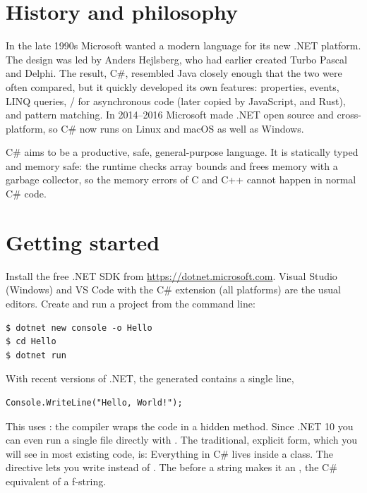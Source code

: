 \section{History and philosophy}

\begin{history}
In the late 1990s Microsoft wanted a modern language for its new .NET platform. The
design was led by Anders Hejlsberg, who had earlier created Turbo Pascal and Delphi. The
result, C\#, resembled Java closely enough that the two were often compared, but it
quickly developed its own features: properties, events, LINQ queries, /
for asynchronous code (later copied by JavaScript, \py and Rust), and pattern matching. In
2014--2016 Microsoft made .NET open source and cross-platform, so C\# now runs on Linux and
macOS as well as Windows.
\end{history}

C\# aims to be a productive, safe, general-purpose language. It is statically typed and
memory safe: the runtime checks array bounds and frees memory with a garbage collector, so
the memory errors of C and C++ cannot happen in normal C\# code.

\section{Getting started}

Install the free .NET SDK from \url{https://dotnet.microsoft.com}. Visual Studio (Windows)
and VS Code with the C\# extension (all platforms) are the usual editors. Create and run a
project from the command line:
\begin{lstlisting}[style=shell]
$ dotnet new console -o Hello
$ cd Hello
$ dotnet run
\end{lstlisting}
With recent versions of .NET, the generated  contains a single line,
\begin{lstlisting}[language={[Sharp]C}]
Console.WriteLine("Hello, World!");
\end{lstlisting}
This uses : the compiler wraps the code in a hidden 
method. Since .NET 10 you can even run a single file directly with . The traditional, explicit form, which you will see in most existing code, is:
Everything in C\# lives inside a class. The  directive lets you write
 instead of . The \code{\$} before a string makes it an
, the C\# equivalent of a \py f-string.


